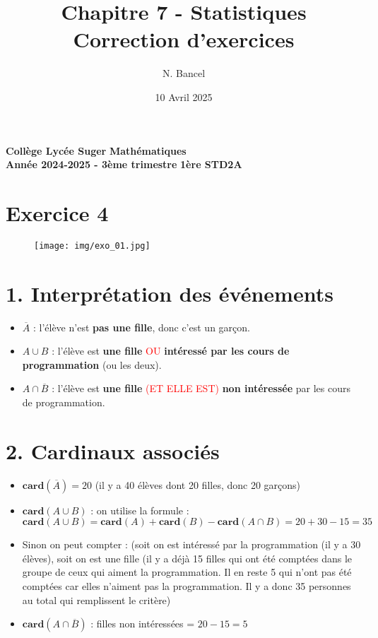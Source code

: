 \documentclass[answers]{exam}
\title{Chapitre 7 - Statistiques \\
\vspace{1em}
\large Correction d'exercices}
\author{N. Bancel}
\date{10 Avril 2025}
\begin{document}
\textbf{Collège Lycée Suger}
\hfill
\textbf{Mathématiques} \\

\textbf{Année 2024-2025 - 3ème trimestre}
\hfill
\textbf{1ère STD2A} \par

{\let\newpage\relax\maketitle}

\section*{Exercice 4}

\begin{figure}[H]
  \centering
  \texttt{[image: img/exo\_01.jpg]}
  \captionsetup{labelformat=empty}
\end{figure}

\begin{solution}
  
\section*{1. Interprétation des événements}

\begin{itemize}
    \item $\overline{A}$ : l'élève n'est \textbf{pas une fille}, donc c’est un garçon.
    \item $A \cup B$ : l'élève est \textbf{une fille} \textcolor{red}{OU} \textbf{intéressé par les cours de programmation} (ou les deux).
    \item $A \cap \overline{B}$ : l'élève est \textbf{une fille} \textcolor{red}{(ET ELLE EST)} \textbf{non intéressée} par les cours de programmation.
\end{itemize}

\section*{2. Cardinaux associés}

\begin{itemize}
    \item $\mathbf{card}(\overline{A}) = 20$ (il y a 40 élèves dont 20 filles, donc 20 garçons)
    \item $\mathbf{card}(A \cup B)$ : on utilise la formule :
    \[
      \mathbf{card}(A \cup B )= \mathbf{card}(A) + \mathbf{card}(B) - \mathbf{card}(A \cap B) = 20 + 30 - 15 = 35
    \]
    \item Sinon on peut compter : (soit on est intéressé par la programmation (il y a 30 élèves), soit on est une fille (il y a déjà 15 filles qui ont été comptées dans le groupe de ceux qui aiment la programmation. Il en reste 5 qui n'ont pas été comptées car elles n'aiment pas la programmation. Il y a donc 35 personnes au total qui remplissent le critère)
    \item $\mathbf{card}(A \cap \overline{B})$ : filles non intéressées = $20 - 15 = 5$
\end{itemize}
\end{solution}
\end{document}
